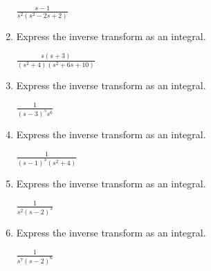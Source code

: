 \documentclass{ximera}
\begin{document}
\begin{problem}
\begin{enumerate}
$\frac{s-1}{s^2(s^2-2s+2)}$

\item Express the inverse transform as an integral.

$\frac{s(s+3)}{(s^2+4)(s^2+6s+10)}$

\item Express the inverse transform as an integral.

$\frac{1}{(s-3)^5s^6}$

\item Express the inverse transform as an integral.

$\frac{1}{(s-1)^3(s^2+4)}$

\item Express the inverse transform as an integral.

$\frac{1}{s^2(s-2)^3}$

\item Express the inverse transform as an integral.

$\frac{1}{s^7(s-2)^6}$
\end{enumerate}
\end{problem}
\end{document}
